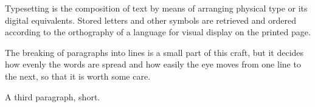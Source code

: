 \documentclass[fontsize=10pt,parskip=full-]{scrartcl}
\begin{document}
Typesetting is the composition of text by means of arranging physical type or its digital equivalents. Stored letters and other symbols are retrieved and ordered according to the orthography of a language for visual display on the printed page.

The breaking of paragraphs into lines is a small part of this craft, but it decides how evenly the words are spread and how easily the eye moves from one line to the next, so that it is worth some care.

A third paragraph, short.
\end{document}
